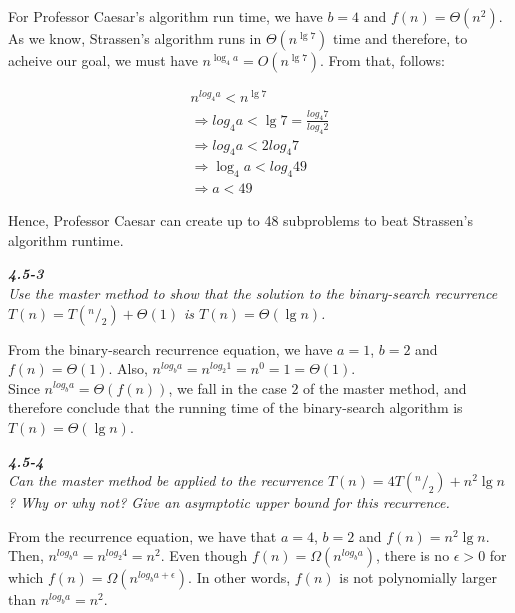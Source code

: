 \documentclass[8pt,a4paper]{article}
\newcommand*\rfrac[2]{{}^{#1}\!/_{#2}}
\begin{document}
For Professor Caesar's algorithm run time, we have $b = 4$ and $f(n) = \Theta(n^{2})$.
As we know, Strassen's algorithm runs in $\Theta(n^{\lg 7})$ time and therefore, to acheive
our goal, we must have $n^{\log_{4} a} = O(n^{\lg 7})$. From that, follows:

\begin{equation*}
  \begin{split}
    n^{log_{4} a} < n^{\lg 7} \\
    \Rightarrow log_{4} a < \lg 7 = \frac{log_{4} 7}{log_{4} 2} \\
    \Rightarrow log_{4} a < 2 log_{4} 7 \\
    \Rightarrow \log_{4} a < log_{4} 49 \\
    \Rightarrow a < 49
  \end{split}
\end{equation*}

  Hence, Professor Caesar can create up to 48 subproblems to beat Strassen's algorithm
runtime.

\newpage

\begin{framed}
\textbf{\textit{4.5-3}} \\
\textit{Use the master method to show that the solution to the binary-search recurrence
$T(n) = T(\rfrac{n}{2}) + \Theta(1)$ is $T(n) = \Theta(\lg n)$.}
\end{framed}

  From the binary-search recurrence equation, we have $a = 1$, $b = 2$ and $f(n) = \Theta(1)$.
Also, $n^{log_{b} a} = n^{log_{2} 1} = n^{0} = 1 = \Theta(1)$. \\

  Since $n^{log_{b} a} = \Theta(f(n))$, we fall in the case $2$ of the master method, and
therefore conclude that the running time of the binary-search algorithm is $T(n) = \Theta(\lg n)$.

\begin{framed}
\textbf{\textit{4.5-4}} \\
\textit{Can the master method be applied to the recurrence $T(n) = 4T(\rfrac{n}{2}) + n^{2}\lg n$?
Why or why not? Give an asymptotic upper bound for this recurrence.}
\end{framed}

  From the recurrence equation, we have that $a = 4$, $b = 2$ and $f(n) = n^{2}\lg n$. Then,
$n^{log_{b} a} = n^{log_{2} 4} = n^{2}$. Even though $f(n) = \Omega(n^{log_{b} a})$, there is
no $\epsilon > 0$ for which $f(n) = \Omega(n^{log_{b} a + \epsilon})$. In other words, $f(n)$
is not polynomially larger than $n^{log_{b} a} = n^{2}$. \\
\end{document}
